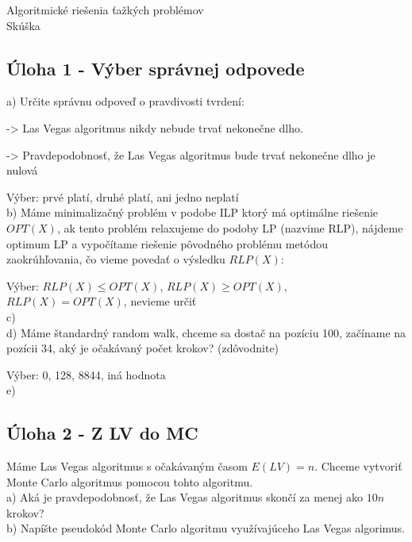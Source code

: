 \documentclass[a4paper]{article}
\begin{document}
 
	
\pagestyle{plain}

\begin{center}
	\sc\large
	Algoritmické riešenia ťažkých problémov\\
	Skúška
\end{center}

\subsection*{Úloha 1 - Výber správnej odpovede}

a) Určite správnu odpoveď o pravdivosti tvrdení:

-> Las Vegas algoritmus nikdy nebude trvať nekonečne dlho.

-> Pravdepodobnosť, že Las Vegas algoritmus bude trvať nekonečne dlho je nulová

Výber: prvé platí, druhé platí, ani jedno neplatí
\\

b) Máme minimalizačný problém v podobe ILP ktorý má optimálne riešenie $OPT(X)$, ak tento problém relaxujeme do podoby LP (nazvime RLP), nájdeme optimum LP a vypočítame riešenie pôvodného problému metódou zaokrúhľovania, čo vieme povedať o výsledku $RLP(X)$:

Výber: $RLP(X) \leq OPT(X)$, $RLP(X) \geq OPT(X)$, $RLP(X) = OPT(X)$, nevieme určiť
\\

c)
\\

d) Máme štandardný random walk, chceme sa dostač na pozíciu 100, začíname na pozícii 34, aký je očakávaný počet krokov? (zdôvodnite)

Výber: 0, 128, 8844, iná hodnota
\\

e) 

\subsection*{Úloha 2 - Z LV do MC}

Máme Las Vegas algoritmus s očakávaným časom $E(LV)=n$. Chceme vytvoriť Monte Carlo algoritmus pomocou tohto algoritmu.
\\

a) Aká je pravdepodobnosť, že Las Vegas algoritmus skončí za menej ako $10n$ krokov?
\\

b) Napíšte pseudokód Monte Carlo algoritmu využívajúceho Las Vegas algorimus.
\\
\end{document}

